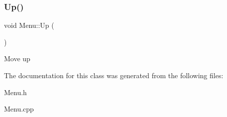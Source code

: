 \subsubsection{\texorpdfstring{Up()}{Up()}}
{\footnotesize\ttfamily void Menu\+::\+Up (\begin{DoxyParamCaption}{ }\end{DoxyParamCaption})}

Move up 

The documentation for this class was generated from the following files\+:\begin{DoxyCompactItemize}
\item 
Menu.\+h\item 
Menu.\+cpp\end{DoxyCompactItemize}
